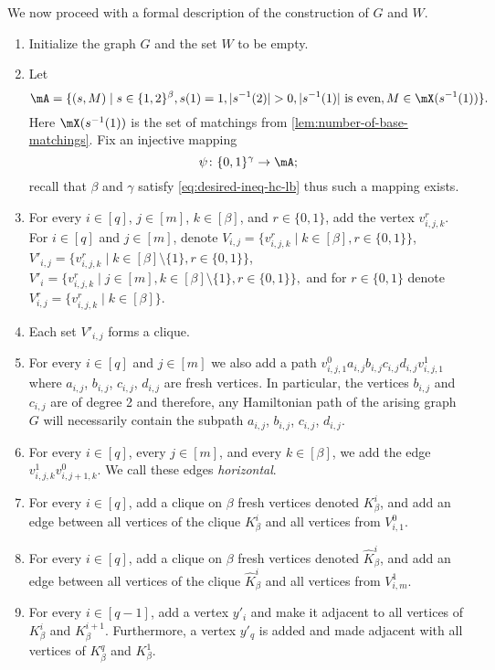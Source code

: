 \documentclass[a4paper,UKenglish,cleveref, autoref, thm-restate]{lipics-v2021}
\begin{document}
We now proceed with a formal description of the construction of $G$ and $W$.
\begin{enumerate}
 \item Initialize the graph $G$ and the set $W$ to be empty.
 \item Let 
 \[
	\mA = \{(s, M) \mid s \in \{1,2\}^\beta, s(1) = 1, |s^{-1}(2)| > 0, |s^{-1}(1)| \text{ is even}, M \in \mX(s^{-1}(1))\}.
 \]
 Here $\mX(s^{-1}(1))$ is the set of matchings from \cref{lem:number-of-base-matchings}.
 Fix an injective mapping 
 \[
		\psi \colon \{0, 1\}^\gamma \to \mA;
 \]
 recall that $\beta$ and $\gamma$ satisfy \eqref{eq:desired-ineq-hc-lb} thus such a mapping exists. 
 \item For every $i \in [q]$, $j \in [m]$, $k \in [\beta]$, and $r \in \{0,1\}$, add the vertex $v^r_{i,j,k}$. 
 For $i \in [q]$ and $j \in [m]$, denote $V_{i,j} = \{v_{i,j,k}^r \mid k \in [\beta], r \in \{0, 1\}\}$, $V'_{i,j} = \{v_{i,j,k}^r \mid k \in [\beta] \setminus \{1\}, r \in \{0, 1\}\}$, $V'_i = \{v_{i,j,k}^r \mid j \in [m], k \in [\beta] \setminus \{1\}, r \in \{0, 1\}\}, $ and for $r \in \{0, 1\}$ denote $V_{i,j}^r = \{v_{i,j,k}^r \mid k \in [\beta]\}$. 
 \item Each set $V'_{i,j}$ forms a clique.
 \item For every $i \in [q]$ and $j \in [m]$ we also add a path $v_{i,j,1}^0 a_{i,j} b_{i,j} c_{i,j} d_{i,j} v_{i,j,1}^1$ where $a_{i,j}$, $b_{i,j}$, $c_{i,j}$, $d_{i,j}$ are fresh vertices. 
In particular, the vertices $b_{i,j}$ and $c_{i,j}$ are of degree 2 and therefore, any Hamiltonian path of the arising graph $G$ will necessarily contain the subpath $a_{i,j}$, $b_{i,j}$, $c_{i,j}$, $d_{i,j}$.
 \item For every $i \in [q]$, every $j \in [m]$, and every $k \in [\beta]$, we add the edge $v_{i,j,k}^1 v_{i,j+1,k}^0$. We call these edges \emph{horizontal}.
 \item For every $i \in [q]$, add a clique on $\beta$ fresh vertices denoted $K_\beta^i$, and add an edge between all vertices
of the clique $K_\beta^i$ and all vertices from $V_{i,1}^0$.
 \item For every $i \in [q]$, add a clique on $\beta$ fresh vertices denoted $\hat{K}_\beta^i$, and add an edge between all vertices of the clique $\hat{K}_\beta^i$ and all vertices from $V_{i,m}^1$.
 \item For every $i \in [q-1]$, add a vertex $y'_i$ and make it adjacent to all vertices of $K^i_\beta$ and $K^{i+1}_\beta$. Furthermore, a vertex $y'_q$ is added and made adjacent with all vertices of $K_\beta^q$ and $K^1_\beta$.

\end{enumerate}
\end{document}
